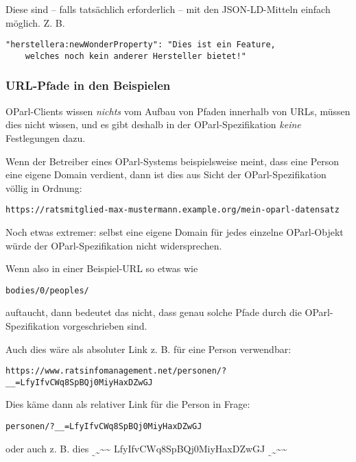 \documentclass[,a4paper]{article}
\begin{document}
Diese sind -- falls tatsächlich erforderlich -- mit den JSON-LD-Mitteln
einfach möglich. Z. B.

\begin{verbatim}
"herstellera:newWonderProperty": "Dies ist ein Feature,
    welches noch kein anderer Hersteller bietet!"
\end{verbatim}

\subsubsection{URL-Pfade in den
Beispielen}\label{url-pfade-in-den-beispielen}

OParl-Clients wissen \emph{nichts} vom Aufbau von Pfaden innerhalb von
URLs, müssen dies nicht wissen, und es gibt deshalb in der
OParl-Spezifikation \emph{keine} Festlegungen dazu.

Wenn der Betreiber eines OParl-Systems beispielsweise meint, dass eine
Person eine eigene Domain verdient, dann ist dies aus Sicht der
OParl-Spezifikation völlig in Ordnung:

\begin{verbatim}
https://ratsmitglied-max-mustermann.example.org/mein-oparl-datensatz
\end{verbatim}

Noch etwas extremer: selbst eine eigene Domain für jedes einzelne
OParl-Objekt würde der OParl-Spezifikation nicht widersprechen.

Wenn also in einer Beispiel-URL so etwas wie

\begin{verbatim}
bodies/0/peoples/
\end{verbatim}

auftaucht, dann bedeutet das nicht, dass genau solche Pfade durch die
OParl-Spezifikation vorgeschrieben sind.

Auch dies wäre als absoluter Link z. B. für eine Person verwendbar:

\begin{verbatim}
https://www.ratsinfomanagement.net/personen/?__=LfyIfvCWq8SpBQj0MiyHaxDZwGJ
\end{verbatim}

Dies käme dann als relativer Link für die Person in Frage:

\begin{verbatim}
personen/?__=LfyIfvCWq8SpBQj0MiyHaxDZwGJ
\end{verbatim}

oder auch z. B. dies
\textsubscript{\textsubscript{\textasciitilde{}}\textasciitilde{}}\textasciitilde{}\textasciitilde{}
LfyIfvCWq8SpBQj0MiyHaxDZwGJ
\textsubscript{\textsubscript{\textasciitilde{}}\textasciitilde{}}\textasciitilde{}\textasciitilde{}
\end{document}
